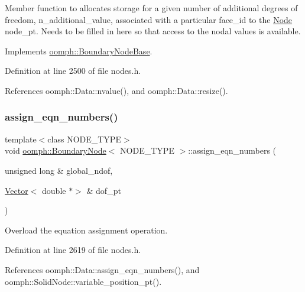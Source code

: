 Member function to allocates storage for a given number of additional degrees of freedom, n\+\_\+additional\+\_\+value, associated with a particular face\+\_\+id to the \hyperlink{classoomph_1_1Node}{Node} node\+\_\+pt. Needs to be filled in here so that access to the nodal values is available. 

Implements \hyperlink{classoomph_1_1BoundaryNodeBase_a2af96b956e59182fe8bfe8e2a87e02ce}{oomph\+::\+Boundary\+Node\+Base}.



Definition at line 2500 of file nodes.\+h.



References oomph\+::\+Data\+::nvalue(), and oomph\+::\+Data\+::resize().

\mbox{\label{classoomph_1_1BoundaryNode_aa74f3753d51454dd0808c8ed782bb3af}} 
\subsubsection{\texorpdfstring{assign\+\_\+eqn\+\_\+numbers()}{assign\_eqn\_numbers()}}
{\footnotesize\ttfamily template$<$class N\+O\+D\+E\+\_\+\+T\+Y\+PE$>$ \\
void \hyperlink{classoomph_1_1BoundaryNode}{oomph\+::\+Boundary\+Node}$<$ N\+O\+D\+E\+\_\+\+T\+Y\+PE $>$\+::assign\+\_\+eqn\+\_\+numbers (\begin{DoxyParamCaption}\item[{unsigned long \&}]{global\+\_\+ndof,  }\item[{\hyperlink{classoomph_1_1Vector}{Vector}$<$ double $\ast$$>$ \&}]{dof\+\_\+pt }\end{DoxyParamCaption})\hspace{0.3cm}{\ttfamily [inline]}}



Overload the equation assignment operation. 



Definition at line 2619 of file nodes.\+h.



References oomph\+::\+Data\+::assign\+\_\+eqn\+\_\+numbers(), and oomph\+::\+Solid\+Node\+::variable\+\_\+position\+\_\+pt().

\mbox{\label{classoomph_1_1BoundaryNode_abf4d213105e2a484dab50e718a8ae654}} 
